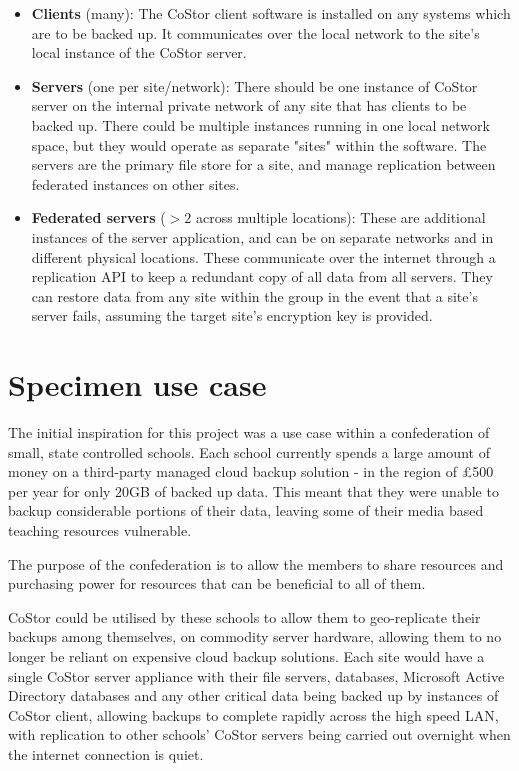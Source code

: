 \documentclass[bsc,frontabs,twoside,singlespacing,parskip,deptreport]{infthesis}     %
\begin{document}
\begin{itemize}
	\item \textbf{Clients} (many):
	\subitem The CoStor client software is installed on any systems which are to be backed up.
	It communicates over the local network to the site's local instance of the CoStor server.
	
	\item \textbf{Servers} (one per site/network):
	\subitem  There should be one instance of CoStor server on the internal private network of 
	any site that has clients to be backed up. There could be multiple instances running in one
	local network space, but they would operate as separate "sites" within the software. The 
	servers are the primary file store for a site, and manage replication between federated
	instances on other sites.
	
	\item \textbf{Federated servers} ($>2$ across multiple locations):
	\subitem These are additional instances of the server application, and can be on separate
	networks and in different physical locations. These communicate over the internet through
	a replication API to keep a redundant copy of all data from all servers. They can restore
	data from any site within the group in the event that a site's server fails, assuming the 
	target site's encryption key is provided.
\end{itemize}


\section{Specimen use case}

The initial inspiration for this project was a use case within a confederation of small, state
controlled schools. Each school currently spends a large amount of money on a third-party 
managed cloud backup solution - in the region of \pounds500 per year for only 20GB of backed
up data. This meant that they were unable to backup considerable portions of their data, leaving
some of their media based teaching resources vulnerable.

The purpose of the confederation is to allow the members to share resources and purchasing power
for resources that can be beneficial to all of them.

CoStor could be utilised by these schools to allow them to geo-replicate their backups among 
themselves, on commodity server hardware, allowing them to no longer be reliant on expensive
cloud backup solutions. Each site would have a single CoStor server appliance with their file
servers, databases, Microsoft Active Directory databases and any other critical data being
backed up by instances of CoStor client, allowing backups to complete rapidly across the high
speed LAN, with replication to other schools' CoStor servers being carried out overnight when 
the internet connection is quiet.
\end{document}
